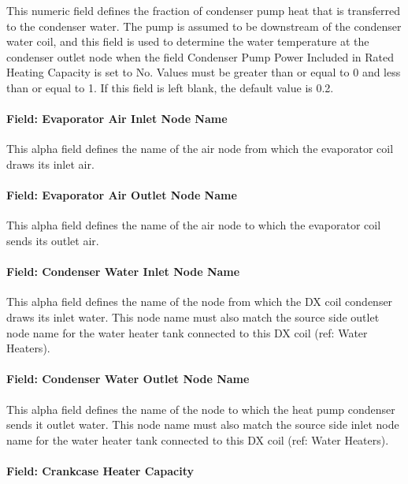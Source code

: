 This numeric field defines the fraction of condenser pump heat that is transferred to the condenser water.
The pump is assumed to be downstream of the condenser water coil, and this field is used to determine the water temperature at the condenser outlet node
when the field Condenser Pump Power Included in Rated Heating Capacity is set to No.
Values must be greater than or equal to 0 and less than or equal to 1. If this field is left blank, the default value is 0.2.


\paragraph{Field: Evaporator Air Inlet Node Name}\label{vshpwhheating-evaporator-air-inlet-node-name}

This alpha field defines the name of the air node from which the evaporator coil draws its inlet air.


\paragraph{Field: Evaporator Air Outlet Node Name}\label{vshpwhheating-evaporator-air-outlet-node-name}

This alpha field defines the name of the air node to which the evaporator coil sends its outlet air.


\paragraph{Field: Condenser Water Inlet Node Name}\label{vshpwhheating-condenser-water-inlet-node-name}

This alpha field defines the name of the node from which the DX coil condenser draws its inlet water. This node name must also match the source side outlet node name for the water heater tank connected to this DX coil (ref: Water Heaters).


\paragraph{Field: Condenser Water Outlet Node Name}\label{vshpwhheating-condenser-water-outlet-node-name}

This alpha field defines the name of the node to which the heat pump condenser sends it outlet water. This node name must also match the source side inlet node name for the water heater tank connected to this DX coil (ref: Water Heaters).


\paragraph{Field: Crankcase Heater Capacity}\label{vshpwhheating-crankcase-heater-capacity}

